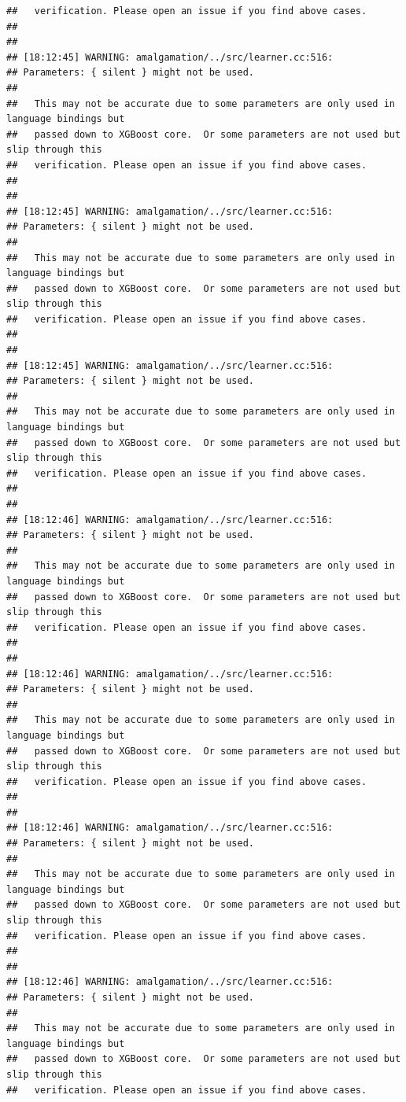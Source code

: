 \documentclass[AMS,STIX2COL]{WileyNJD-v2}\usepackage[]{graphicx}\usepackage[]{color}
\makeatletter
\newenvironment{kframe}{%
 \def\at@end@of@kframe{}%
 \ifinner\ifhmode%
  \def\at@end@of@kframe{\end{minipage}}%
  \begin{minipage}{\columnwidth}%
 \fi\fi%
 \def\FrameCommand##1{\hskip\@totalleftmargin \hskip-\fboxsep
 \colorbox{shadecolor}{##1}\hskip-\fboxsep
     \hskip-\linewidth \hskip-\@totalleftmargin \hskip\columnwidth}%
 \MakeFramed {\advance\hsize-\width
   \@totalleftmargin\z@ \linewidth\hsize
   \@setminipage}}%
 {\par\unskip\endMakeFramed%
 \at@end@of@kframe}
\newenvironment{knitrout}{}{} %
\makeatother
\begin{document}
\begin{knitrout}
\begin{kframe}
\begin{verbatim}
##   verification. Please open an issue if you find above cases.
## 
## 
## [18:12:45] WARNING: amalgamation/../src/learner.cc:516: 
## Parameters: { silent } might not be used.
## 
##   This may not be accurate due to some parameters are only used in language bindings but
##   passed down to XGBoost core.  Or some parameters are not used but slip through this
##   verification. Please open an issue if you find above cases.
## 
## 
## [18:12:45] WARNING: amalgamation/../src/learner.cc:516: 
## Parameters: { silent } might not be used.
## 
##   This may not be accurate due to some parameters are only used in language bindings but
##   passed down to XGBoost core.  Or some parameters are not used but slip through this
##   verification. Please open an issue if you find above cases.
## 
## 
## [18:12:45] WARNING: amalgamation/../src/learner.cc:516: 
## Parameters: { silent } might not be used.
## 
##   This may not be accurate due to some parameters are only used in language bindings but
##   passed down to XGBoost core.  Or some parameters are not used but slip through this
##   verification. Please open an issue if you find above cases.
## 
## 
## [18:12:46] WARNING: amalgamation/../src/learner.cc:516: 
## Parameters: { silent } might not be used.
## 
##   This may not be accurate due to some parameters are only used in language bindings but
##   passed down to XGBoost core.  Or some parameters are not used but slip through this
##   verification. Please open an issue if you find above cases.
## 
## 
## [18:12:46] WARNING: amalgamation/../src/learner.cc:516: 
## Parameters: { silent } might not be used.
## 
##   This may not be accurate due to some parameters are only used in language bindings but
##   passed down to XGBoost core.  Or some parameters are not used but slip through this
##   verification. Please open an issue if you find above cases.
## 
## 
## [18:12:46] WARNING: amalgamation/../src/learner.cc:516: 
## Parameters: { silent } might not be used.
## 
##   This may not be accurate due to some parameters are only used in language bindings but
##   passed down to XGBoost core.  Or some parameters are not used but slip through this
##   verification. Please open an issue if you find above cases.
## 
## 
## [18:12:46] WARNING: amalgamation/../src/learner.cc:516: 
## Parameters: { silent } might not be used.
## 
##   This may not be accurate due to some parameters are only used in language bindings but
##   passed down to XGBoost core.  Or some parameters are not used but slip through this
##   verification. Please open an issue if you find above cases.

\end{verbatim}
\end{kframe}
\end{knitrout}
\end{document}
